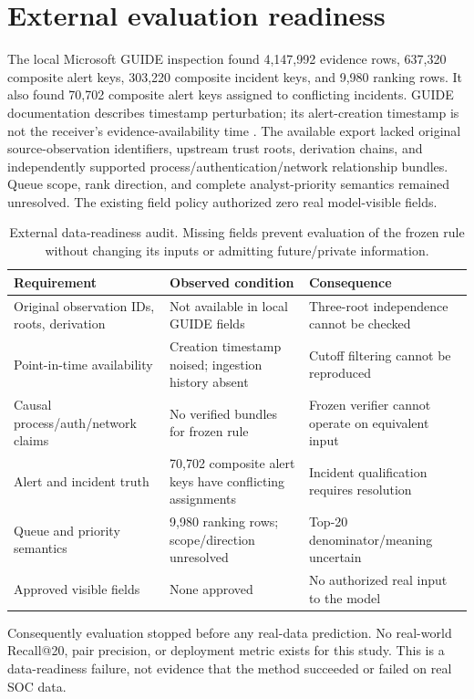 \section{External evaluation readiness}
The local Microsoft GUIDE inspection found 4,147,992 evidence rows, 637,320 composite alert keys, 303,220 composite incident keys, and 9,980 ranking rows. It also found 70,702 composite alert keys assigned to conflicting incidents. GUIDE documentation describes timestamp perturbation; its alert-creation timestamp is not the receiver's evidence-availability time \cite{guide2024}. The available export lacked original source-observation identifiers, upstream trust roots, derivation chains, and independently supported process/authentication/network relationship bundles. Queue scope, rank direction, and complete analyst-priority semantics remained unresolved. The existing field policy authorized zero real model-visible fields.

\begin{table}[t]\centering\footnotesize\caption{External data-readiness audit. Missing fields prevent evaluation of the frozen rule without changing its inputs or admitting future/private information.}\label{tab:readiness}\begin{tabularx}{\textwidth}{@{}p{}Y Y@{}}\toprule Requirement & Observed condition & Consequence\\\midrule Original observation IDs, roots, derivation & Not available in local GUIDE fields & Three-root independence cannot be checked\\ Point-in-time availability & Creation timestamp noised; ingestion history absent & Cutoff filtering cannot be reproduced\\ Causal process/auth/network claims & No verified bundles for frozen rule & Frozen verifier cannot operate on equivalent input\\ Alert and incident truth & 70,702 composite alert keys have conflicting assignments & Incident qualification requires resolution\\ Queue and priority semantics & 9,980 ranking rows; scope/direction unresolved & Top-20 denominator/meaning uncertain\\ Approved visible fields & None approved & No authorized real input to the model\\\bottomrule\end{tabularx}\end{table}

Consequently evaluation stopped before any real-data prediction. No real-world Recall@20, pair precision, or deployment metric exists for this study. This is a data-readiness failure, not evidence that the method succeeded or failed on real SOC data.
